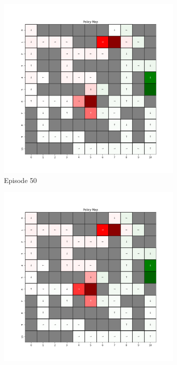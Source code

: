 \documentclass{assignment}
\begin{document}
\begin{figure}[H]
\begin{subfigure}{0.3\textwidth}
        \includegraphics[width=\textwidth]{figures/policy_td/alpha_sweep/policy_alpha_0.001_gamma_0.95_epsilon_0.2_iteration_50.png}
    \caption{Episode 50}
    \end{subfigure}\hfill
    \begin{subfigure}{0.3\textwidth}
        \includegraphics[width=\textwidth]{figures/policy_td/alpha_sweep/policy_alpha_0.001_gamma_0.95_epsilon_0.2_iteration_100.png}

\end{subfigure}
\end{figure}
\end{document}
